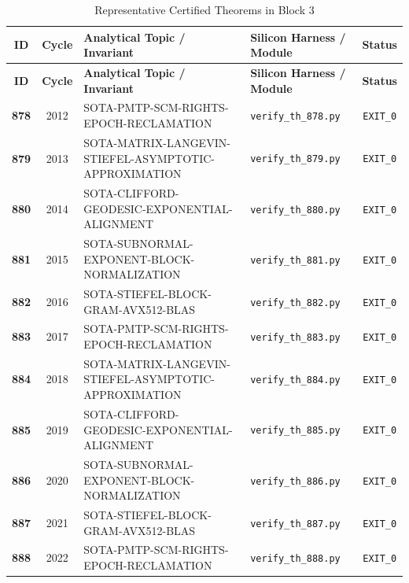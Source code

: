\documentclass[journal,10pt,compsoc]{IEEEtran}
\theoremstyle{plain}
\theoremstyle{definition}
\begin{document}
\begin{center}
\small
\begin{longtable}{ccp{6.8cm}p{5.2cm}c}
\caption{Representative Certified Theorems in Block 3} \label{tab:theorems_block_3} \\
\toprule
\textbf{ID} & \textbf{Cycle} & \textbf{Analytical Topic / Invariant} & \textbf{Silicon Harness / Module} & \textbf{Status} \\
\midrule
\endfirsthead
\toprule
\textbf{ID} & \textbf{Cycle} & \textbf{Analytical Topic / Invariant} & \textbf{Silicon Harness / Module} & \textbf{Status} \\
\midrule
\endhead
\bottomrule
\endfoot
\textbf{878} & 2012 & SOTA-PMTP-SCM-RIGHTS-EPOCH-RECLAMATION \label{thm:polydim_0878} & \texttt{verify\_th\_878.py} & \texttt{EXIT\_0} \\
\textbf{879} & 2013 & SOTA-MATRIX-LANGEVIN-STIEFEL-ASYMPTOTIC-APPROXIMATION \label{thm:polydim_0879} & \texttt{verify\_th\_879.py} & \texttt{EXIT\_0} \\
\textbf{880} & 2014 & SOTA-CLIFFORD-GEODESIC-EXPONENTIAL-ALIGNMENT \label{thm:polydim_0880} & \texttt{verify\_th\_880.py} & \texttt{EXIT\_0} \\
\textbf{881} & 2015 & SOTA-SUBNORMAL-EXPONENT-BLOCK-NORMALIZATION \label{thm:polydim_0881} & \texttt{verify\_th\_881.py} & \texttt{EXIT\_0} \\
\textbf{882} & 2016 & SOTA-STIEFEL-BLOCK-GRAM-AVX512-BLAS \label{thm:polydim_0882} & \texttt{verify\_th\_882.py} & \texttt{EXIT\_0} \\
\textbf{883} & 2017 & SOTA-PMTP-SCM-RIGHTS-EPOCH-RECLAMATION \label{thm:polydim_0883} & \texttt{verify\_th\_883.py} & \texttt{EXIT\_0} \\
\textbf{884} & 2018 & SOTA-MATRIX-LANGEVIN-STIEFEL-ASYMPTOTIC-APPROXIMATION \label{thm:polydim_0884} & \texttt{verify\_th\_884.py} & \texttt{EXIT\_0} \\
\textbf{885} & 2019 & SOTA-CLIFFORD-GEODESIC-EXPONENTIAL-ALIGNMENT \label{thm:polydim_0885} & \texttt{verify\_th\_885.py} & \texttt{EXIT\_0} \\
\textbf{886} & 2020 & SOTA-SUBNORMAL-EXPONENT-BLOCK-NORMALIZATION \label{thm:polydim_0886} & \texttt{verify\_th\_886.py} & \texttt{EXIT\_0} \\
\textbf{887} & 2021 & SOTA-STIEFEL-BLOCK-GRAM-AVX512-BLAS \label{thm:polydim_0887} & \texttt{verify\_th\_887.py} & \texttt{EXIT\_0} \\
\textbf{888} & 2022 & SOTA-PMTP-SCM-RIGHTS-EPOCH-RECLAMATION \label{thm:polydim_0888} & \texttt{verify\_th\_888.py} & \texttt{EXIT\_0} \\

\end{longtable}
\end{center}
\end{document}
